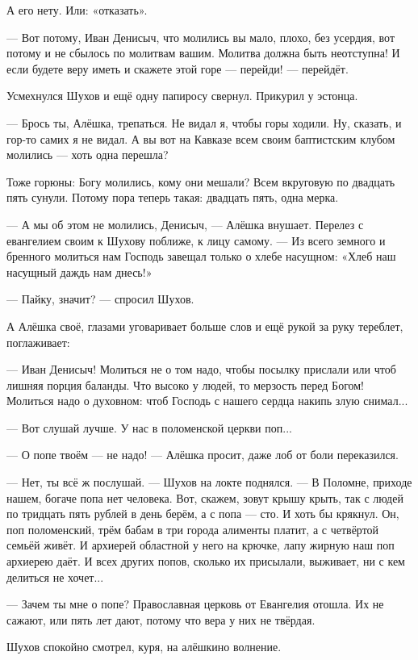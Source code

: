 А его нету. Или: «отказать».

--- Вот потому, Иван Денисыч, что молились вы мало, плохо, без усердия, вот потому и не сбылось
по молитвам вашим. Молитва должна быть неотступна! И если будете веру иметь и скажете этой
горе --- перейди! --- перейдёт.

Усмехнулся Шухов и ещё одну папиросу свернул. Прикурил у эстонца.

--- Брось ты, Алёшка, трепаться. Не видал я, чтобы горы ходили. Ну, сказать, и гор-то самих я не
видал. А вы вот на Кавказе всем своим баптистским клубом молились --- хоть одна перешла?

Тоже горюны: Богу молились, кому они мешали? Всем вкруговую по двадцать пять сунули. Потому
пора теперь такая: двадцать пять, одна мерка.

--- А мы об этом не молились, Денисыч, --- Алёшка внушает. Перелез с евангелием своим к Шухову
поближе, к лицу самому. --- Из всего земного и бренного молиться нам Господь завещал только о
хлебе насущном: «Хлеб наш насущный даждь нам днесь!»

--- Пайку, значит? --- спросил Шухов.

А Алёшка своё, глазами уговаривает больше слов и ещё рукой за руку тереблет, поглаживает:

--- Иван Денисыч! Молиться не о том надо, чтобы посылку прислали или чтоб лишняя порция
баланды. Что высоко у людей, то мерзость перед Богом! Молиться надо о духовном: чтоб Господь с
нашего сердца накипь злую снимал...

--- Вот слушай лучше. У нас в поломенской церкви поп...

--- О попе твоём --- не надо! --- Алёшка просит, даже лоб от боли переказился.

--- Нет, ты всё ж послушай. --- Шухов на локте поднялся. --- В Поломне, приходе нашем, богаче попа
нет человека. Вот, скажем, зовут крышу крыть, так с людей по тридцать пять рублей в день берём,
а с попа --- сто. И хоть бы крякнул. Он, поп поломенский, трём бабам в три города алименты
платит, а с четвёртой семьёй живёт. И архиерей областной у него на крючке, лапу жирную наш поп
архиерею даёт. И всех других попов, сколько их присылали, выживает, ни с кем делиться не
хочет...

--- Зачем ты мне о попе? Православная церковь от Евангелия отошла. Их не сажают, или пять лет
дают, потому что вера у них не твёрдая.

Шухов спокойно смотрел, куря, на алёшкино волнение.

